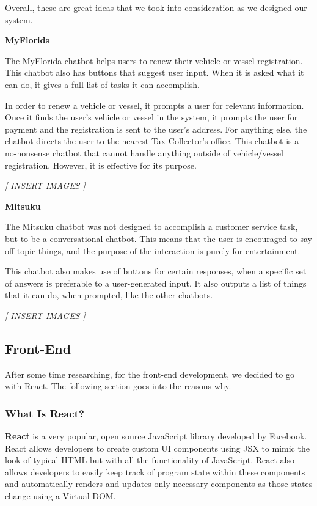 \documentclass[titlepage, 12pt]{article}
\begin{document}
Overall, these are great ideas that we took into consideration as we designed our system.

\textbf{MyFlorida}

The MyFlorida chatbot helps users to renew their vehicle or vessel registration. This chatbot also has buttons that suggest user input. When it is asked what it can do, it gives a full list of tasks it can accomplish.

In order to renew a vehicle or vessel, it prompts a user for relevant information. Once it finds the user’s vehicle or vessel in the system, it prompts the user for payment and the registration is sent to the user’s address. For anything else, the chatbot directs the user to the nearest Tax Collector’s office. This chatbot is a no-nonsense chatbot that cannot handle anything outside of vehicle/vessel registration. However, it is effective for its purpose.

\begin{center}\emph{[ INSERT IMAGES ]}\end{center}

\textbf{Mitsuku}

The Mitsuku chatbot was not designed to accomplish a customer service task, but to be a conversational chatbot. This means that the user is encouraged to say off-topic things, and the purpose of the interaction is purely for entertainment. 
 
This chatbot also makes use of buttons for certain responses, when a specific set of answers is preferable to a user-generated input. It also outputs a list of things that it can do, when prompted, like the other chatbots.

\begin{center}\emph{[ INSERT IMAGES ]}\end{center}



\subsection{Front-End}

After some time researching, for the front-end development, we decided to go with React. The following section goes into the reasons why.

\subsubsection{What Is React?}

\textbf{React} is a very popular, open source JavaScript library developed by Facebook. React allows developers to create custom UI components using JSX to mimic the look of typical HTML but with all the functionality of JavaScript. React also allows developers to easily keep track of program state within these components and automatically renders and updates only necessary components as those states change using a Virtual DOM.
\end{document}
